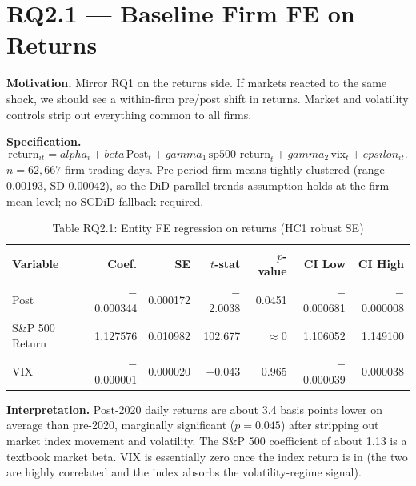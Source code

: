 \documentclass[11pt]{article}
\def\beta{beta}%
\def\alpha{alpha}%
\def\gamma{gamma}%
\def\varepsilon{epsilon}%
\begin{document}
\section*{RQ2.1 --- Baseline Firm FE on Returns}\label{sec:rq2.1}
\textbf{Motivation.} Mirror RQ1 on the returns side. If markets reacted to the same shock, we should see a within-firm pre/post shift in returns. Market and volatility controls strip out everything common to all firms.

\textbf{Specification.}
\[
\text{return}_{it} = \alpha_i + \beta\,\text{Post}_t + \gamma_1\,\text{sp500\_return}_t + \gamma_2\,\text{vix}_t + \varepsilon_{it}.
\]
$n = 62{,}667$ firm-trading-days. Pre-period firm means tightly clustered (range 0.00193, SD 0.00042), so the DiD parallel-trends assumption holds at the firm-mean level; no SCDiD fallback required.

\begin{table}[H]
\centering
\caption*{Table RQ2.1: Entity FE regression on returns (HC1 robust SE)}
\begin{tabular}{lrrrrrr}
\toprule
Variable & Coef. & SE & $t$-stat & $p$-value & CI Low & CI High \\
\midrule
Post & $-$0.000344 & 0.000172 & $-$2.0038 & 0.0451 & $-$0.000681 & $-$0.000008 \\
S\&P 500 Return & 1.127576 & 0.010982 & 102.677 & $\approx 0$ & 1.106052 & 1.149100 \\
VIX & $-$0.000001 & 0.000020 & $-$0.043 & 0.965 & $-$0.000039 & 0.000038 \\
\bottomrule
\end{tabular}
\end{table}

\textbf{Interpretation.} Post-2020 daily returns are about 3.4 basis points lower on average than pre-2020, marginally significant ($p = 0.045$) after stripping out market index movement and volatility. The S\&P 500 coefficient of about 1.13 is a textbook market beta. VIX is essentially zero once the index return is in (the two are highly correlated and the index absorbs the volatility-regime signal).


\end{document}
